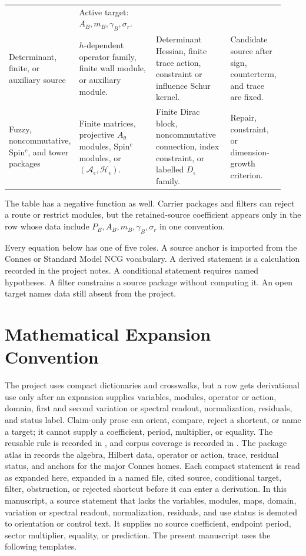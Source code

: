 \documentclass[11pt]{article}
\begin{document}
\begin{center}
\begin{tabular}{@{}L{0.20\linewidth}L{0.28\linewidth}L{0.27\linewidth}L{0.18\linewidth}@{}}
  & Active target: \(A_B,m_B,\gamma_B,\sigma_r\). \\
Determinant, finite, or auxiliary source
  & \(h\)-dependent operator family, finite wall module, or auxiliary
    module.
  & Determinant Hessian, finite trace action, constraint or influence
    Schur kernel.
  & Candidate source after sign, counterterm, and trace are fixed. \\
Fuzzy, noncommutative, Spin\({}^c\), and tower packages
  & Finite matrices, projective \(A_\theta\) modules, Spin\({}^c\)
    modules, or \((\mathcal A_\epsilon,\mathcal H_\epsilon)\).
  & Finite Dirac block, noncommutative connection, index constraint, or
    labelled \(D_\epsilon\) family.
  & Repair, constraint, or dimension-growth criterion. \\
\bottomrule
\end{tabular}
\end{center}

The table has a negative function as well.  Carrier packages and filters can
reject a route or restrict modules, but the retained-source coefficient
appears only in the row whose data include \(P_B,A_B,m_B,\gamma_B,\sigma_r\)
in one convention.

Every equation below has one of five roles.  A source anchor is imported
from the Connes or Standard Model NCG vocabulary.  A derived statement is a
calculation recorded in the project notes.  A conditional statement
requires named hypotheses.  A filter constrains a source package without
computing it.  An open target names data still absent from the project.

\section{Mathematical Expansion Convention}

The project uses compact dictionaries and crosswalks, but a row gets
derivational use only after an expansion supplies variables, modules,
operator or action, domain, first and second variation or spectral readout,
normalization, residuals, and status label.  Claim-only prose can orient,
compare, reject a shortcut, or name a target; it cannot supply a coefficient,
period, multiplier, or equality.  The reusable rule is recorded in
\cite{math-expansion}, and corpus coverage is recorded in
\cite{math-expansion-coverage}.  The package atlas in
\cite{ncg-package-atlas} records the algebra, Hilbert data, operator or
action, trace, residual status, and anchors for the major Connes homes.  Each
compact statement is read as expanded here, expanded in a named file, cited
source, conditional target, filter, obstruction, or rejected shortcut before
it can enter a derivation.
In this manuscript, a source statement that lacks the variables, modules,
maps, domain, variation or spectral readout, normalization, residuals, and use
status is demoted to orientation or control text.  It supplies no source
coefficient, endpoint period, sector multiplier, equality, or prediction.
The present manuscript uses the following templates.
\end{document}
